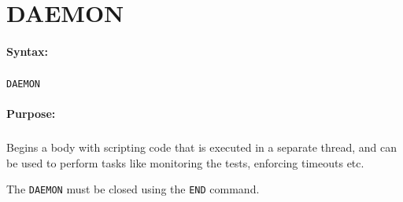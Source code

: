 
\newpage
\section{DAEMON}
\label{cmd:DAEMON}

\paragraph{Syntax:}
\subparagraph{}
\texttt{DAEMON}

\paragraph{Purpose:}
\subparagraph{}
Begins a body with scripting code that is executed in a separate 
thread, and can be used to perform tasks like monitoring the 
tests, enforcing timeouts etc.

The \texttt{DAEMON} must be closed using the \texttt{END} command.